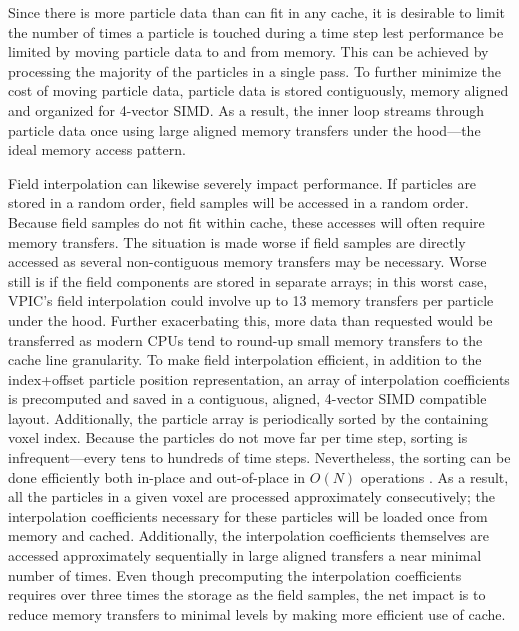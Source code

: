 \documentclass[letter,10pt]{article}
\begin{document}
Since there is more particle data than can fit in any cache, it is
desirable to limit the number of times a particle is touched during a
time step lest performance be limited by moving particle data to and
from memory.  This can be achieved by processing the majority of the
particles in a single pass.  To further minimize the cost of moving
particle data, particle data is stored contiguously, memory aligned
and organized for 4-vector SIMD.  As a result, the inner loop streams
through particle data once using large aligned memory transfers under
the hood---the ideal memory access pattern.

Field interpolation can likewise severely impact performance.  If
particles are stored in a random order, field samples will be accessed
in a random order.  Because field samples do not fit within cache,
these accesses will often require memory transfers.  The situation is
made worse if field samples are directly accessed as several
non-contiguous memory transfers may be necessary.  Worse still is if the
field components are stored in separate arrays; in this worst case,
VPIC's field interpolation could involve up to 13 memory transfers per
particle under the hood.  Further exacerbating this, more data than
requested would be transferred as modern CPUs tend to round-up small
memory transfers to the cache line granularity.  To make field
interpolation efficient, in addition to the index+offset particle
position representation, an array of interpolation coefficients is
precomputed and saved in a contiguous, aligned, 4-vector SIMD
compatible layout.  Additionally, the particle array is periodically
sorted by the containing voxel index.  Because the particles do not
move far per time step, sorting is infrequent---every tens to hundreds
of time steps.  Nevertheless, the sorting can be done efficiently both
in-place and out-of-place in $O(N)$ operations \cite{Bowers_2001}.  As
a result, all the particles in a given voxel are processed
approximately consecutively; the interpolation coefficients necessary
for these particles will be loaded once from memory and cached.
Additionally, the interpolation coefficients themselves are accessed
approximately sequentially in large aligned transfers a near minimal
number of times.  Even though precomputing the interpolation
coefficients requires over three times the storage as the field
samples, the net impact is to reduce memory transfers to minimal
levels by making more efficient use of cache.

\end{document}
